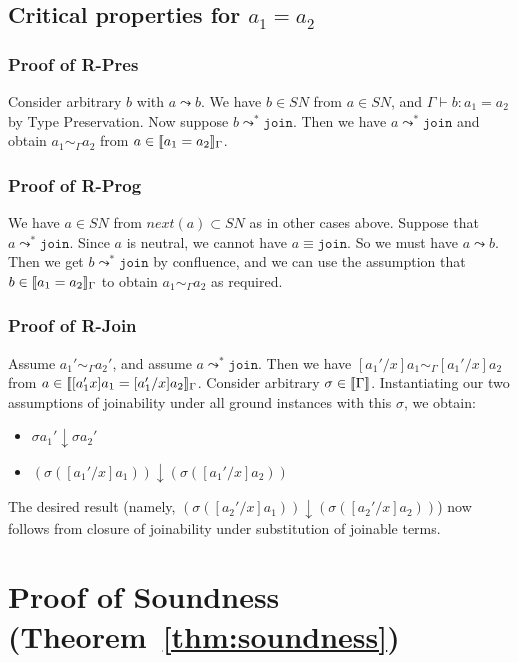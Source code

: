 \documentclass[copyright]{eptcs}
\newcommand{\next}[0]{\textit{next}}
\newcommand{\SN}[0]{\textit{SN}}
\newcommand{\join}[0]{\texttt{join}}
\newcommand{\interp}[1]{[\negthinspace[#1]\negthinspace]}
\begin{document}
\subsection{Critical properties for $a_1 = a_2$}

\subsubsection{Proof of \textbf{R-Pres}}

Consider arbitrary $b$ with $a\leadsto b$.  We
have $b\in\SN$ from $a\in\SN$, and $\Gamma\vdash b: a_1 = a_2$ by Type
Preservation.  Now suppose $b\leadsto^* \join$.  Then we have
$a\leadsto^* \join$ and obtain $a_1\sim_\Gamma a_2$ from
$a\in\interp{a_1 = a_2}_\Gamma$.  

\subsubsection{Proof of \textbf{R-Prog}}

We have $a\in\SN$ from $\next(a)\subset\SN$ as in other cases above.
Suppose that $a\leadsto^* \join$.  Since $a$ is neutral, we cannot
have $a\equiv \join$.  So we must have $a\leadsto b$.  Then we get
$b\leadsto^* \join$ by confluence, and we can use the assumption that
$b\in\interp{a_1 = a_2}_\Gamma$ to obtain $a_1 \sim_\Gamma a_2$ as
required.

\subsubsection{Proof of \textbf{R-Join}}

Assume $a_1'\sim_\Gamma a_2'$, and assume $a\leadsto^*\join$.  Then we
have $[a_1'/x]a_1\sim_\Gamma [a_1'/x]a_2$ from $a\in\interp{[a_1'x]a_1
  = [a_1'/x]a_2}_\Gamma$.  Consider arbitrary
$\sigma\in\interp{\Gamma}$.  Instantiating our two assumptions of
joinability under all ground instances with this $\sigma$, we obtain:
\begin{itemize}
\item $\sigma a_1'\downarrow \sigma a_2'$
\item $(\sigma ([a_1'/x]a_1))\downarrow (\sigma ([a_1'/x]a_2))$
\end{itemize}
\noindent The desired result (namely, $(\sigma
([a_2'/x]a_1))\downarrow (\sigma ([a_2'/x]a_2))$) now follows from 
closure of joinability under substitution of joinable terms.

\section{Proof of Soundness (Theorem~\ref{thm:soundness})}
\end{document}
